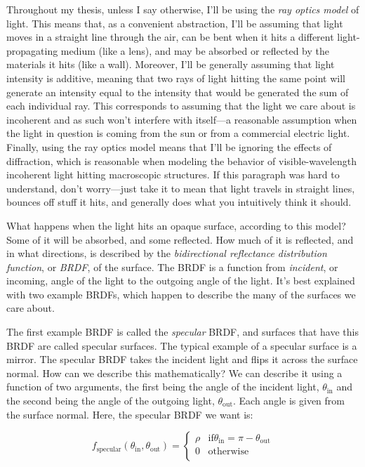 Throughout my thesis, unless I say otherwise, I'll be using the \emph{ray optics model} of light. This means that, as a convenient abstraction, I'll be assuming that light moves in a straight line through the air, can be bent when it hits a different light-propagating medium (like a lens), and may be absorbed or reflected by the materials it hits (like a wall). Moreover, I'll be generally assuming that light intensity is additive, meaning that two rays of light hitting the same point will generate an intensity equal to the intensity that would be generated the sum of each individual ray. This corresponds to assuming that the light we care about is incoherent and as such won't interfere with itself---a reasonable assumption when the light in question is coming from the sun or from a commercial electric light. Finally, using the ray optics model means that I'll be ignoring the effects of diffraction, which is reasonable when modeling the behavior of visible-wavelength incoherent light hitting macroscopic structures. If this paragraph was hard to understand, don't worry---just take it to mean that light travels in straight lines, bounces off stuff it hits, and generally does what you intuitively think it should.

What happens when the light hits an opaque surface, according to this model? Some of it will be absorbed, and some reflected. How much of it is reflected, and in what directions, is described by the \emph{bidirectional reflectance distribution function}, or \emph{BRDF}, of the surface. The BRDF is a function from \emph{incident}, or incoming, angle of the light to the outgoing angle of the light. It's best explained with two example BRDFs, which happen to describe the many of the surfaces we care about.

The first example BRDF is called the \emph{specular} BRDF, and surfaces that have this BRDF are called specular surfaces. The typical example of a specular surface is a mirror. The specular BRDF takes the incident light and flips it across the surface normal. How can we describe this mathematically? We can describe it using a function of two arguments, the first being the angle of the incident light, $\theta_{\textrm{in}}$ and the second being the angle of the outgoing light, $\theta_{\textrm{out}}$. Each angle is given from the surface normal. \footnotemark Here, the specular BRDF we want is:

\[
  f_{\textrm{specular}}(\theta_{\textrm{in}}, \theta_{\textrm{out}}) =
  \begin{cases}
                                   \rho & \text{if} \theta_{\textrm{in}} = \pi - \theta_{\textrm{out}} \\
                                   0 & \text{otherwise} \\
  \end{cases}
\]

